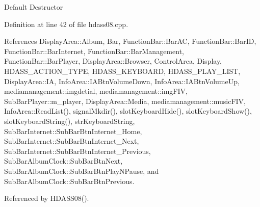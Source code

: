 Default Destructor 

Definition at line 42 of file hdass08.cpp.

References Display\-Area::Album, Bar, Function\-Bar::Bar\-AC, Function\-Bar::Bar\-ID, Function\-Bar::Bar\-Internet, Function\-Bar::Bar\-Management, Function\-Bar::Bar\-Player, Display\-Area::Browser, Control\-Area, Display, HDASS\_\-ACTION\_\-TYPE, HDASS\_\-KEYBOARD, HDASS\_\-PLAY\_\-LIST, Display\-Area::IA, Info\-Area::IABtn\-Volume\-Down, Info\-Area::IABtn\-Volume\-Up, mediamanagement::imgdetial, mediamanagement::img\-FIV, Sub\-Bar\-Player::m\_\-player, Display\-Area::Media, mediamanagement::music\-FIV, Info\-Area::Read\-List(), signal\-Mkdir(), slot\-Keyboard\-Hide(), slot\-Keyboard\-Show(), slot\-Keyboard\-String(), str\-Keyboard\-String, Sub\-Bar\-Internet::Sub\-Bar\-Btn\-Internet\_\-Home, Sub\-Bar\-Internet::Sub\-Bar\-Btn\-Internet\_\-Next, Sub\-Bar\-Internet::Sub\-Bar\-Btn\-Internet\_\-Previous, Sub\-Bar\-Album\-Clock::Sub\-Bar\-Btn\-Next, Sub\-Bar\-Album\-Clock::Sub\-Bar\-Btn\-Play\-NPause, and Sub\-Bar\-Album\-Clock::Sub\-Bar\-Btn\-Previous.

Referenced by HDASS08().



